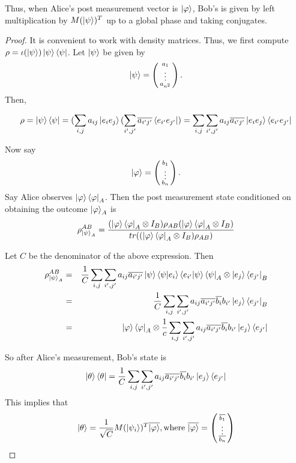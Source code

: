Thus, when Alice's post measurement vector is $\ket{\varphi}$, Bob's is given by left multiplication by $M(\ket{\psi})^T$ up to a global phase and taking conjugates.

\begin{proof}
It is convenient to work with density matrices.  Thus, we first compute $\rho=\iota(\ket{\psi})\ket{\psi}\bra{\psi}$.  Let $\ket{\psi}$ be given by 
\begin{equation}
\ket{\psi}=\left(\begin{smallmatrix}a_1\\ \vdots \\a_{n^2}\end{smallmatrix}\right).
\end{equation}
Then, 

\begin{equation}
\rho=\ket{\psi}\bra{\psi}=(\sum_{i,j} a_{ij}\ket{e_i e_j}(\sum_{i',j'} \overline{a_{i'j'}}\bra{e_{i'} e_{j'}})=\sum_{i,j} \sum_{i',j'} a_{ij} \overline{a_{i'j'}}\ket{e_i e_j}\bra{e_{i'} e_{j'}}   
\end{equation}

Now say
\begin{equation}
\ket{\varphi}=\left(\begin{smallmatrix}b_1\\ \vdots \\b_n\end{smallmatrix}\right).
\end{equation}
Say Alice observes $\ket{\varphi}\bra{\varphi}_A$.
Then the post measurement state conditioned on obtaining the outcome $\ket{\varphi}_A$ is
\begin{equation}
\rho_{\ket{\psi}_A}^{AB}=\frac{(\ket{\varphi}\bra{\varphi}_A \otimes I_B)\rho_{AB}(\ket{\varphi}\bra{\varphi}_A \otimes I_B)}{tr((\ket{\varphi}\bra{\varphi}_A \otimes I_B)\rho_{AB})}
\end{equation}

Let $C$ be the denominator of the above expression. Then 
\begin{eqnarray}
\rho_{\ket{\psi}_A}^{AB}&=&\frac{1}{C} \sum_{i,j} \sum_{{i'}, {j'}} a_{ij} \overline{a_{i'j'}}\ket{\psi}\braket{\psi|e_i}\braket{e_{i'}|\psi}\bra{\psi}_A \otimes \ket{e_j}\bra{e_{j'}}_B\\
&=&\frac{1}{C} \sum_{i,j} \sum_{{i'}, {j'}} a_{ij} \overline{a_{i'j'}}\overline{b_i}b_{i'}\ket{e_j}\bra{e_{j'}}_B\\
&=&\ket{\varphi}\bra{\varphi}_A \otimes \frac{1}{c} \sum_{i,j} \sum_{{i'}, {j'}} a_{ij} \overline{a_{i'j'}}\overline{b_i}b_{i'}\ket{e_j}\bra{e_{j'}}
\end{eqnarray}

So after Alice's measurement, Bob's state is
\begin{equation}
    \ket{\theta}\bra{\theta}=\frac{1}{C} \sum_{i,j} \sum_{{i'}, {j'}} a_{ij} \overline{a_{i'j'}}\overline{b_i}b_{i'}\ket{e_j}\bra{e_{j'}} 
\end{equation}
This implies that 
\begin{equation}
    \ket{\theta}=\frac{1}{\sqrt{C}} M(\ket{\psi_i})^T \overline{\ket{\varphi}},
    \text{where } \overline{\ket{\varphi}}=\left(\begin{smallmatrix}\overline{b_1}\\ \vdots \\ \overline{b_n}\end{smallmatrix}\right)
\end{equation}



\end{proof}
